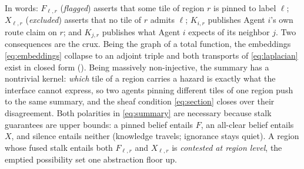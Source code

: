 \documentclass[10pt]{article}
\theoremstyle{definition}
\theoremstyle{remark}
\begin{document}
In words: $F_{\ell,r}$ (\emph{flagged}) asserts that some tile of region $r$ is pinned to label $\ell$; $X_{\ell,r}$ (\emph{excluded}) asserts that no tile of $r$ admits $\ell$; $K_{i,r}$ publishes Agent $i$'s own route claim on $r$; and $K_{j,r}$ publishes what Agent $i$ expects of its neighbor $j$.
Two consequences are the crux. Being the graph of a total function, the embeddings \eqref{eq:embeddings} collapse to an adjoint triple and both transports of \eqref{eq:laplacian} exist in closed form (). Being massively non-injective, the summary has a nontrivial kernel: \emph{which} tile of a region carries a hazard is exactly what the interface cannot express, so two agents pinning different tiles of one region push to the same summary, and the sheaf condition \eqref{eq:section} closes over their disagreement. Both polarities in \eqref{eq:summary} are necessary because stalk guarantees are upper bounds: a pinned belief entails $F$, an all-clear belief entails $X$, and silence entails neither (knowledge travels; ignorance stays quiet). A region whose fused stalk entails both $F_{\ell,r}$ and $X_{\ell,r}$ is \emph{contested at region level}, the emptied possibility set one abstraction floor up.
\end{document}
